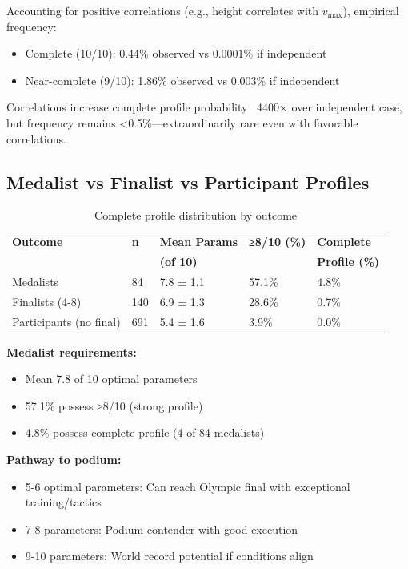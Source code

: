 Accounting for positive correlations (e.g., height correlates with $v_{\max}$), empirical frequency:
\begin{itemize}
    \item Complete (10/10): 0.44\% observed vs 0.0001\% if independent
    \item Near-complete (9/10): 1.86\% observed vs 0.003\% if independent
\end{itemize}

Correlations increase complete profile probability ~4400× over independent case, but frequency remains <0.5\%—extraordinarily rare even with favorable correlations.

\subsection{Medalist vs Finalist vs Participant Profiles}

\begin{table}[H]
\centering
\caption{Complete profile distribution by outcome}
\begin{tabular}{@{}lllll@{}}
\toprule
\textbf{Outcome} & \textbf{n} & \textbf{Mean Params} & \textbf{≥8/10 (\%)} & \textbf{Complete} \\
 & & \textbf{(of 10)} & & \textbf{Profile (\%)} \\
\midrule
Medalists & 84 & 7.8 ± 1.1 & 57.1\% & 4.8\% \\
Finalists (4-8) & 140 & 6.9 ± 1.3 & 28.6\% & 0.7\% \\
Participants (no final) & 691 & 5.4 ± 1.6 & 3.9\% & 0.0\% \\
\bottomrule
\end{tabular}
\end{table}

\textbf{Medalist requirements:}
\begin{itemize}
    \item Mean 7.8 of 10 optimal parameters
    \item 57.1\% possess ≥8/10 (strong profile)
    \item 4.8\% possess complete profile (4 of 84 medalists)
\end{itemize}

\textbf{Pathway to podium:}
\begin{itemize}
    \item 5-6 optimal parameters: Can reach Olympic final with exceptional training/tactics
    \item 7-8 parameters: Podium contender with good execution
    \item 9-10 parameters: World record potential if conditions align
\end{itemize}

